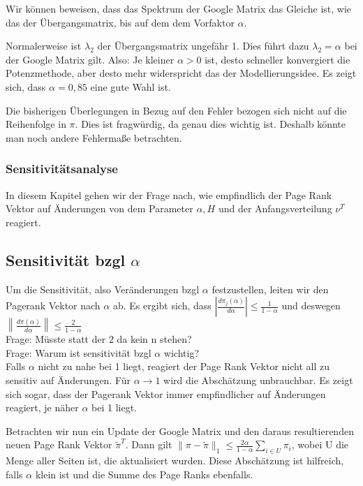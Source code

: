 \documentclass[]{article}
\begin{document}
Wir können beweisen, dass das Spektrum der Google Matrix das Gleiche ist, wie das der Übergangsmatrix, bis auf dem dem Vorfaktor $\alpha $. 

Normalerweise ist $\lambda_2$ der Übergangsmatrix ungefähr 1. Dies führt dazu $\lambda_2 = \alpha$ bei der Google Matrix gilt. Also: Je kleiner $\alpha>0$ ist, desto schneller konvergiert die Potenzmethode, aber desto mehr widerspricht das der Modellierungsidee. Es zeigt sich, dass $\alpha = 0,85$ eine gute Wahl ist.     

Die bisherigen Überlegungen in Bezug auf den Fehler bezogen sich nicht auf die Reihenfolge in $\pi$. Dies ist fragwürdig, da genau dies wichtig ist. Deshalb könnte man noch andere Fehlermaße betrachten.

\subsubsection{Sensitivitätsanalyse}

In diesem Kapitel gehen wir der Frage nach, wie empfindlich der Page Rank Vektor auf Änderungen von dem Parameter $\alpha, H $ und der Anfangsverteilung $\nu^T$ reagiert. 

\subsection*{Sensitivität bzgl $\alpha$}
Um die Sensitivität, also Veränderungen bzgl $\alpha$ festzustellen, leiten wir den Pagerank Vektor nach $\alpha$ ab. Es ergibt sich, dass $\left| \frac{d \pi_j(\alpha)}{d \alpha}\right| \le \frac{1}{1 - \alpha} $ und deswegen $\left\| \frac{d \pi(\alpha)}{d \alpha} \right\| \le \frac{2}{1 - \alpha} $ \\

Frage: Müsste statt der 2 da kein n stehen? \\

Frage: Warum ist sensitivität bzgl $\alpha $ wichtig? \\

Falls $\alpha$ nicht zu nahe bei 1 liegt, reagiert der Page Rank Vektor nicht all zu sensitiv auf Änderungen. Für $\alpha \rightarrow 1$ wird die Abschätzung unbrauchbar. Es zeigt sich sogar, dass der Pagerank Vektor immer empfindlicher auf Änderungen reagiert, je näher $\alpha$ bei 1 liegt. 

Betrachten wir nun ein Update der Google Matrix und den daraus resultierenden neuen Page Rank Vektor $\tilde{\pi}^T$. Dann gilt $\| \pi - \tilde{\pi}\|_1 \le \frac{2 \alpha}{1 - \alpha } \sum\limits_{i \in U} \pi_i$, wobei U die Menge aller Seiten ist, die aktualisiert wurden. Diese Abschätzung ist hilfreich, falls $\alpha$ klein ist und die Summe des Page Ranks ebenfalls.  
\end{document}
